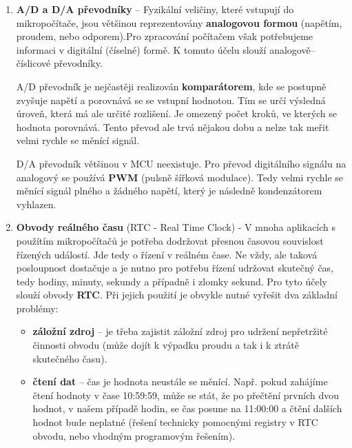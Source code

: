 \begin{enumerate}
    \item \textbf{A/D a D/A převodníky} -- Fyzikální veličiny, které vstupují do mikropočítače, jsou většinou reprezentovány
          \textbf{analogovou formou} (napětím, proudem, nebo odporem).Pro zpracování počítačem však potřebujeme informaci v digitální (číselné) formě. K tomuto účelu slouží analogově–číslicové převodníky.

          A/D převodník je nejčastěji realizován \textbf{komparátorem}, kde se postupně zvyšuje napětí a porovnává se se vstupní hodnotou. Tím se určí výsledná úroveň, která má ale určité rozlišení. Je omezený počet kroků, ve kterých se hodnota porovnává. Tento převod ale trvá nějakou dobu a nelze tak meřit velmi rychle se měnící signál.

          D/A převodník většinou v MCU neexistuje. Pro převod digitálního signálu na analogový se používá \textbf{PWM} (pulsně šířková modulace). Tedy velmi rychle se měnící signál plného a žádného napětí, který je následně kondenzátorem vyhlazen.

    \item \textbf{Obvody reálného času} (RTC - Real Time Clock) - V mnoha aplikacích s použítím mikropočítačů je potřeba dodržovat přesnou časovou souvislost řízených událostí. Jde tedy o řízení v reálném čase. Ne vždy, ale taková posloupnost dostačuje a je nutno pro potřebu řízení udržovat skutečný čas, tedy hodiny, minuty, sekundy a případně i zlomky sekund. Pro tyto účely slouží obvody \textbf{RTC}. Při jejich použití je obvykle nutné vyřešit dva základní problémy:
          \begin{itemize}
              \item \textbf{záložní zdroj} -- je třeba zajistit záložní zdroj pro udržení nepřetržité činnosti obvodu (může dojít k výpadku proudu a tak i k ztrátě skutečného času).
              \item \textbf{čtení dat} -- čas je hodnota neustále se měnící. Např. pokud zahájíme čtení hodnoty v čase 10:59:59, může se stát, že po přečtění prvních dvou hodnot, v našem případě hodin, se čas posune na 11:00:00 a čtění dalších hodnot bude neplatné (řešení technicky pomocnými registry v RTC obvodu, nebo vhodným programovým řešením).
          \end{itemize}
\end{enumerate}

